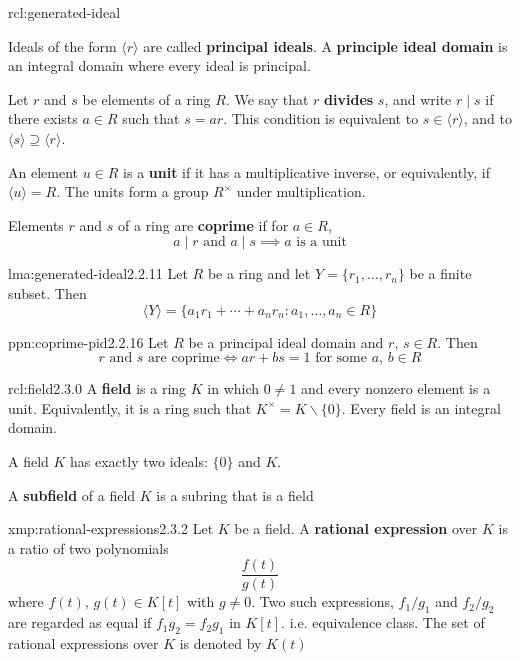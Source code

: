 \documentclass[landscape, 8pt]{extarticle}
\begin{document}
\begin{multicols}{3}
\begin{rcl}{rcl:generated-ideal}{}
    \longrule{0.08ex}
    \begin{itemize-zero}
        \item Ideals of the form $\langle r \rangle$ are called \textbf{principal ideals}. A \textbf{principle ideal domain} is an integral domain where every ideal is principal.
        \item Let $r$ and $s$ be elements of a ring $R$. We say that $r$ \textbf{divides} $s$, and write $r \mid s$ if there exists $a\in R$ such that $s = ar$. This condition is equivalent to $s\in \langle r \rangle$, and to $\langle s \rangle \supseteq \langle r \rangle$.
        \item An element $u\in R$ is a \textbf{unit} if it has a multiplicative inverse, or equivalently, if $\langle u \rangle = R$. The units form a group $R^{\times}$ under multiplication.
        \item Elements $r$ and $s$ of a ring are \textbf{coprime} if for $a\in R$,
            \[a \mid r \text{ and } a \mid s \implies a \text{ is a unit}\]
    \end{itemize-zero}
\end{rcl}

\begin{lma}{lma:generated-ideal}{2.2.11}
    Let $R$ be a ring and let $Y = \{r_{1},\dots,r_{n}\}$ be a finite subset. Then
    \[\langle Y \rangle = \{a_{1}r_{1} + \cdots + a_{n}r_{n} : a_{1},\dots, a_{n} \in R\}\]
\end{lma}

\begin{ppn}{ppn:coprime-pid}{2.2.16}
    Let $R$ be a principal ideal domain and $r,\,s\in R$. Then
    \[r \text{ and } s \text{ are coprime} \iff ar + bs = 1 \text{ for some } a,\,b\in R\]
\end{ppn}

\begin{rcl}[Field]{rcl:field}{2.3.0}
    A \textbf{field} is a ring $K$ in which $0 \ne 1$ and every nonzero element is a unit. Equivalently, it is a ring such that $K^{\times} = K \backslash \{0\}$. Every field is an integral domain.

    A field $K$ has exactly two ideals: $\{0\}$ and $K$.

    A \textbf{subfield} of a field $K$ is a subring that is a field
\end{rcl}

\begin{xmp}{xmp:rational-expressions}{2.3.2}
    Let $K$ be a field. A \textbf{rational expression} over $K$ is a ratio of two polynomials
    \[\frac{f(t)}{g(t)}\]
    where $f(t),\,g(t)\in K[t]$ with $g\ne 0$. Two such expressions, $f_{1} /g_{1}$ and $f_{2} /g_{2}$ are regarded as equal if $f_{1}g_{2} = f_{2}g_{1}$ in $K[t]$. i.e. equivalence class. The set of rational expressions over $K$ is denoted by $K(t)$
\end{xmp}


\end{multicols}
\end{document}
